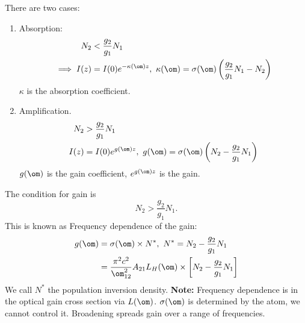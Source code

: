 \documentclass[a4paper, 11pt, normalem]{report}
\begin{document}
There are two cases:
\begin{enumerate}
    \item Absorption:
        \begin{align}
            N_2 &< \frac{g_2}{g_1}N_1 \\
            \implies I(z) &= I(0)e^{-\kappa(\om)z},~ \kappa(\om) = \sigma(\om)\left(\frac{g_2}{g_1}N_1 - N_2\right)  
        \end{align}
        $\kappa$ is the absorption coefficient. 
        \begin{figure}[H]
            \centering
        \end{figure}
    \item Amplification.
        \begin{align}
            N_2 &> \frac{g_2}{g_1}N_1 \\
            I(z) &= I(0)e^{g(\om)z},~ g(\om) = \sigma(\om)\left(N_2-\frac{g_2}{g_1}N_1\right)
        \end{align}
        $g(\om)$ is the gain coefficient, $e^{g(\om)z}$ is the gain. 
        \begin{figure}[H]
            \centering
        \end{figure}
\end{enumerate}
The condition for gain is
\begin{equation}
    N_2 > \frac{g_2}{g_1}N_1.
\end{equation}
This is known as 
Frequency dependence of the gain:
\begin{align}
    g(\om) &= \sigma(\om)\times N^*, ~ N^* = N_2 - \frac{g_2}{g_1}N_1 \\
           &= \frac{\pi^2c^2}{\om_{12}^2}A_{21}L_H(\om)\times \left[N_2-\frac{g_2}{g_1}N_1\right]
\end{align}
We call $N^*$ the population inversion density. 
\textbf{Note:} Frequency dependence is in the optical gain cross section via $L(\om)$. 
$\sigma(\om)$ is determined by the atom, we cannot control it. 
Broadening spreads gain over a range of frequencies. 
\end{document}
